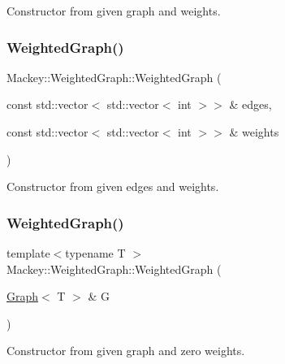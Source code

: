 Constructor from given graph and weights. 

\mbox{\label{classMackey_1_1WeightedGraph_a5949ba99b50db23d59c124a4ff9a3072}} 
\subsubsection{\texorpdfstring{Weighted\+Graph()}{WeightedGraph()}\hspace{0.1cm}{\footnotesize\ttfamily [3/4]}}
{\footnotesize\ttfamily Mackey\+::\+Weighted\+Graph\+::\+Weighted\+Graph (\begin{DoxyParamCaption}\item[{const std\+::vector$<$ std\+::vector$<$ int $>$$>$ \&}]{edges,  }\item[{const std\+::vector$<$ std\+::vector$<$ int $>$$>$ \&}]{weights }\end{DoxyParamCaption})}



Constructor from given edges and weights. 

\mbox{\label{classMackey_1_1WeightedGraph_ad5932440f83ea50f802d96b44c2da5e3}} 
\subsubsection{\texorpdfstring{Weighted\+Graph()}{WeightedGraph()}\hspace{0.1cm}{\footnotesize\ttfamily [4/4]}}
{\footnotesize\ttfamily template$<$typename T $>$ \\
Mackey\+::\+Weighted\+Graph\+::\+Weighted\+Graph (\begin{DoxyParamCaption}\item[{\hyperlink{classMackey_1_1Graph}{Graph}$<$ T $>$ \&}]{G }\end{DoxyParamCaption})}



Constructor from given graph and zero weights. 




